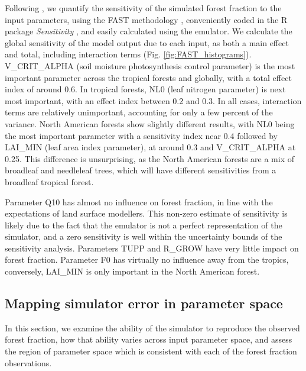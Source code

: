 \documentclass[esd, article]{copernicus} %
\begin{document}
Following \citep{carslaw2013large}, we quantify the sensitivity of the simulated forest fraction to the input parameters, using the FAST methodology \citep{saltelli1999sensitivity}, conveniently coded in the R package \emph{Sensitivity} \citep{Rpackage2015sensitivity}, and easily calculated using the emulator. We calculate the global sensitivity of the model output due to each input, as both a main effect and total, including interaction terms (Fig.  \ref{fig:FAST_histograms}). V\_CRIT\_ALPHA (soil moisture photosynthesis control parameter) is the most important parameter across the tropical forests and globally, with a total effect index of around 0.6. In tropical forests, NL0 (leaf nitrogen parameter) is next most important, with an effect index between 0.2 and 0.3. In all cases, interaction terms are relatively unimportant, accounting for only a few percent of the variance. North American forests show slightly different results, with NL0 being the most important parameter with a sensitivity index near 0.4 followed by LAI\_MIN (leaf area index parameter), at around 0.3 and V\_CRIT\_ALPHA at 0.25. This difference is unsurprising, as the North American forests are a mix of broadleaf and needleleaf trees, which will have different sensitivities from a broadleaf tropical forest.


Parameter Q10 has almost no influence on forest fraction, in line with the expectations of land surface modellers. This non-zero estimate of sensitivity is likely due to the fact that the emulator is not a perfect representation of the simulator, and a zero sensitivity is well within the uncertainty bounds of the sensitivity analysis. Parameters TUPP and R\_GROW have very little impact on forest fraction. Parameter F0 has virtually no influence away from the tropics, conversely, LAI\_MIN is only important in the North American forest.


\subsection{Mapping simulator error in parameter space}\label{ssec:mapping}

In this section, we examine the ability of the simulator to reproduce the observed forest fraction, how that ability varies across input parameter space, and assess the region of parameter space which is consistent with each of the forest fraction observations.
\end{document}
